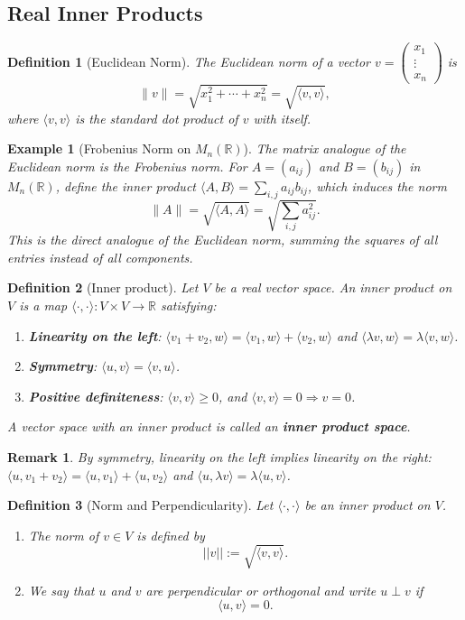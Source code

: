 \documentclass{article}
\newtheorem{definition}{Definition}
\newtheorem*{example}{Example}
\newtheorem{remark}{Remark}
\begin{document}
\subsection{Real Inner Products}
\begin{definition}[Euclidean Norm]
    The Euclidean norm of a vector $v=\begin{pmatrix}x_1\\\vdots\\x_n\end{pmatrix}$ is
    \[\|v\| = \sqrt{x_1^2+\cdots+x_n^2} = \sqrt{\langle v,v\rangle},\]
    where $\langle v,v\rangle$ is the standard dot product of $v$ with itself.
\end{definition}
\begin{example}[Frobenius Norm on $M_n(\mathbb{R})$]
    The matrix analogue of the Euclidean norm is the Frobenius norm. For $A=(a_{ij})$ and $B=(b_{ij})$ in $M_n(\mathbb{R})$, define the inner product $\langle A,B\rangle = \sum_{i,j} a_{ij}b_{ij}$, which induces the norm
    \[\|A\| = \sqrt{\langle A,A\rangle} = \sqrt{\sum_{i,j} a_{ij}^2}.\]
    This is the direct analogue of the Euclidean norm, summing the squares of all entries instead of all components.
\end{example}
\begin{definition}[Inner product]
    Let $V$ be a real vector space. An inner product on $V$ is a map $\langle\cdot,\cdot\rangle : V\times V \to \mathbb{R}$ satisfying:
    \begin{enumerate}
        \item \textbf{Linearity on the left}: $\langle v_1+v_2,w\rangle = \langle v_1,w\rangle + \langle v_2,w\rangle$ and $\langle\lambda v,w\rangle = \lambda\langle v,w\rangle$.
        \item \textbf{Symmetry}: $\langle u,v\rangle = \langle v,u\rangle$.
        \item \textbf{Positive definiteness}: $\langle v,v\rangle \ge 0$, and $\langle v,v\rangle = 0 \Rightarrow v=0$.
    \end{enumerate}
    A vector space with an inner product is called an \textbf{inner product space}.
\end{definition}
\begin{remark}
    By symmetry, linearity on the left implies linearity on the right: $\langle u,v_1+v_2\rangle = \langle u,v_1\rangle+\langle u,v_2\rangle$ and $\langle u,\lambda v\rangle = \lambda\langle u,v\rangle$.
\end{remark}
\begin{definition}[Norm and Perpendicularity]
    Let $\langle\cdot,\cdot\rangle$ be an inner product on $V$.
    \begin{enumerate}
        \item The norm of $v\in V$ is defined by \[||v|| := \sqrt{\langle v,v\rangle}.\]
        \item We say that $u$ and $v$ are perpendicular or orthogonal and write $u \perp v$ if \[\langle u,v \rangle=0.\]
    \end{enumerate}
\end{definition}
\end{document}
